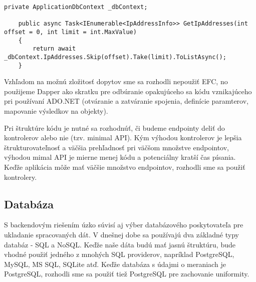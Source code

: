 \begin{lstlisting}[float,language={[Sharp]C},caption={Ukážka kódu pre ten istý dopyt pomocou rôznych knižníc - EFC},label=alg:Ukazka_EFC]
    private ApplicationDbContext _dbContext;

    public async Task<IEnumerable<IpAddressInfo>> GetIpAddresses(int offset = 0, int limit = int.MaxValue)
    {
        return await _dbContext.IpAddresses.Skip(offset).Take(limit).ToListAsync();
    }
\end{lstlisting}

Vzhľadom na možnú zložitosť dopytov sme sa rozhodli nepoužiť EFC, no použijeme Dapper ako skratku pre odbúranie opakujúceho sa kódu vznikajúceho 
pri používaní ADO.NET (otváranie a zatváranie spojenia, definície paramterov, mapovanie výsledkov na objekty).

Pri štruktúre kódu je nutné sa rozhodnúť, či budeme endpointy deliť do kontrolerov alebo nie (tzv. minimal API). Kým výhodou kontrolerov je lepšia 
štrukturovateľnosť a väčšia prehľadnosť pri väčšom množstve endpointov, výhodou mimal API je mierne menej kódu a potenciálny kratší čas písania. Keďže 
aplikácia môže mať väčšie množstvo endpointov, rozhodli sme sa použiť kontrolery.

\subsection{Databáza}

S backendovým riešením úzko súvisí aj výber databázového poskytovateľa pre ukladanie spracovaných dát. V dnešnej dobe sa používajú dva základné typy databáz 
- SQL a NoSQL. Keďže naše dáta budú mať jasnú štruktúru, bude vhodné použiť jedného z mnohých SQL providerov, napríklad PostgreSQL, MySQL, MS SQL, SQLite atď. 
Keďže databáza s údajmi o meraniach je PostgreSQL, rozhodli sme sa použiť tiež PostgreSQL pre zachovanie uniformity.